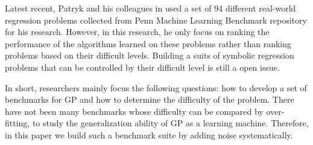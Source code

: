 Latest recent, Patryk and his colleagues in \cite{orzechowski2018we} used a set of 94 different real-world regression problems collected from 
Penn Machine Learning Benchmark repository for his research. However, in this research, he only focus on ranking the performance of the algorithms learned on these problems rather than ranking problems based on their difficult levels. Building a suits of symbolic regression problems that can be controlled by their difficult level is still a open issue.

In short, researchers mainly focus the following questions: how to develop a set of benchmarks for GP and how to determine the difficulty of the problem. There have not been many benchmarks whose difficulty can be compared by over-fitting, to study the generalization ability of GP as a learning machine. Therefore, in this paper we build such a benchmark suite by adding noise systematically.

